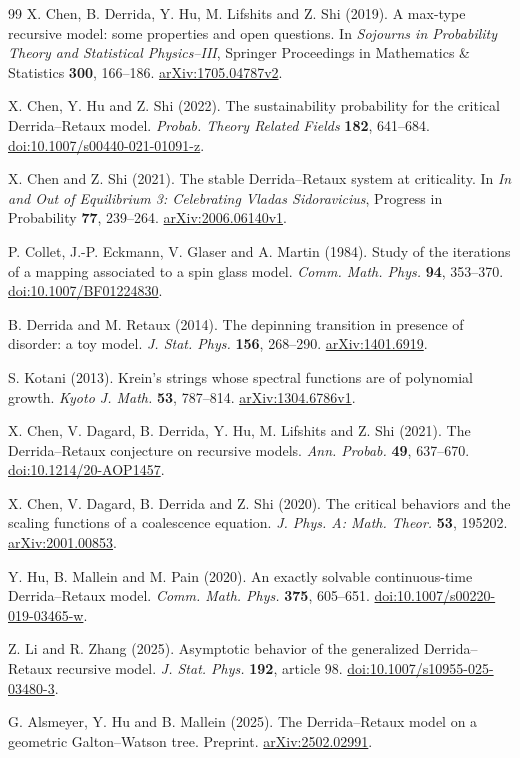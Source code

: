 \documentclass[11pt,letterpaper,reqno]{amsart}
\theoremstyle{plain}
\begin{document}
\begin{thebibliography}{99}
 X. Chen, B. Derrida, Y. Hu, M. Lifshits and Z. Shi (2019).
A max-type recursive model: some properties and open questions.
In \emph{Sojourns in Probability Theory and Statistical Physics--III},
Springer Proceedings in Mathematics \& Statistics \textbf{300}, 166--186.
\href{https://arxiv.org/abs/1705.04787v2}{arXiv:1705.04787v2}.

 X. Chen, Y. Hu and Z. Shi (2022).
The sustainability probability for the critical Derrida--Retaux model.
\emph{Probab. Theory Related Fields} \textbf{182}, 641--684.
\href{https://doi.org/10.1007/s00440-021-01091-z}{doi:10.1007/s00440-021-01091-z}.

 X. Chen and Z. Shi (2021).
The stable Derrida--Retaux system at criticality.
In \emph{In and Out of Equilibrium 3: Celebrating Vladas Sidoravicius},
Progress in Probability \textbf{77}, 239--264.
\href{https://arxiv.org/abs/2006.06140v1}{arXiv:2006.06140v1}.

 P. Collet, J.-P. Eckmann, V. Glaser and A. Martin (1984).
Study of the iterations of a mapping associated to a spin glass model.
\emph{Comm. Math. Phys.} \textbf{94}, 353--370.
\href{https://doi.org/10.1007/BF01224830}{doi:10.1007/BF01224830}.

 B. Derrida and M. Retaux (2014).
The depinning transition in presence of disorder: a toy model.
\emph{J. Stat. Phys.} \textbf{156}, 268--290.
\href{https://arxiv.org/abs/1401.6919}{arXiv:1401.6919}.

 S. Kotani (2013).
Krein's strings whose spectral functions are of polynomial growth.
\emph{Kyoto J. Math.} \textbf{53}, 787--814.
\href{https://arxiv.org/abs/1304.6786v1}{arXiv:1304.6786v1}.

 X. Chen, V. Dagard, B. Derrida, Y. Hu, M. Lifshits and Z. Shi (2021).
The Derrida--Retaux conjecture on recursive models.
\emph{Ann. Probab.} \textbf{49}, 637--670.
\href{https://doi.org/10.1214/20-AOP1457}{doi:10.1214/20-AOP1457}.

 X. Chen, V. Dagard, B. Derrida and Z. Shi (2020).
The critical behaviors and the scaling functions of a coalescence equation.
\emph{J. Phys. A: Math. Theor.} \textbf{53}, 195202.
\href{https://arxiv.org/abs/2001.00853}{arXiv:2001.00853}.

 Y. Hu, B. Mallein and M. Pain (2020).
An exactly solvable continuous-time Derrida--Retaux model.
\emph{Comm. Math. Phys.} \textbf{375}, 605--651.
\href{https://doi.org/10.1007/s00220-019-03465-w}{doi:10.1007/s00220-019-03465-w}.

 Z. Li and R. Zhang (2025).
Asymptotic behavior of the generalized Derrida--Retaux recursive model.
\emph{J. Stat. Phys.} \textbf{192}, article 98.
\href{https://doi.org/10.1007/s10955-025-03480-3}{doi:10.1007/s10955-025-03480-3}.

 G. Alsmeyer, Y. Hu and B. Mallein (2025).
The Derrida--Retaux model on a geometric Galton--Watson tree.
Preprint.
\href{https://arxiv.org/abs/2502.02991}{arXiv:2502.02991}.
\end{thebibliography}
\end{document}
